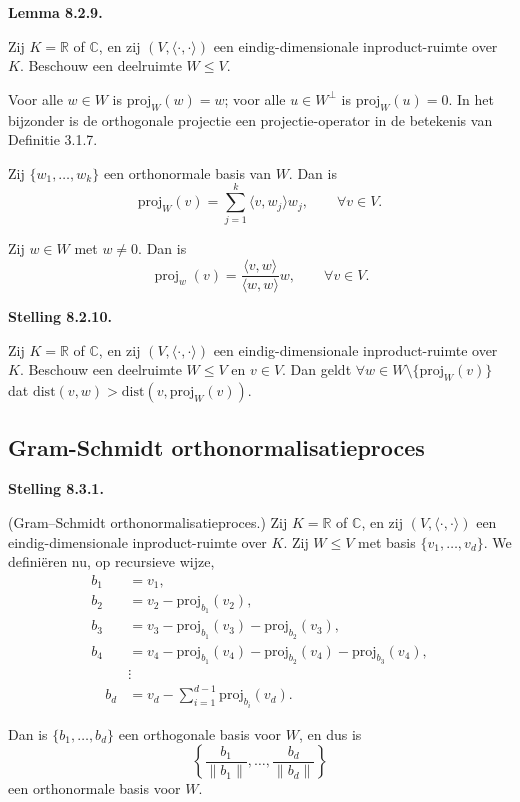 \documentclass[10pt,a4paper]{article}
\newenvironment{res}[2]{%
  \par\noindent\textbf{#1 #2.}%
}{%
  \par\vspace{2pt}\normalfont
}
\begin{document}
\begin{res}{Lemma}{8.2.9}
Zij $K=\mathbb R$ of $\mathbb C$, en zij $(V,\langle\cdot,\cdot\rangle)$ een eindig-dimensionale inproduct-ruimte over $K$. Beschouw een deelruimte $W\le V$.
\begin{myenum}
\item Voor alle $w\in W$ is $\mathrm{proj}_W(w)=w$; voor alle $u\in W^\perp$ is $\mathrm{proj}_W(u)=0$. In het bijzonder is de orthogonale projectie een projectie-operator in de betekenis van Definitie 3.1.7.
\item Zij $\{w_1,\dots,w_k\}$ een orthonormale basis van $W$. Dan is
\[
\mathrm{proj}_W(v)=\sum_{j=1}^k \langle v,w_j\rangle w_j,\qquad \forall v \in V.
\]
\item Zij \(w \in W\) met \(w \neq 0\). Dan is
\[
\operatorname{proj}_w (v) = \frac{\langle v , w \rangle}{\langle w,w\rangle}w, \qquad \forall v \in V.
\]
\end{myenum}
\end{res}

\begin{res}{Stelling}{8.2.10}
Zij $K=\mathbb R$ of $\mathbb C$, en zij $(V,\langle\cdot,\cdot\rangle)$ een eindig-dimensionale inproduct-ruimte over $K$.
Beschouw een deelruimte $W\le V$ en $v\in V$. Dan geldt $\forall w\in W\setminus\{\mathrm{proj}_W(v)\}$ dat $\mathrm{dist}(v,w)>\mathrm{dist}(v,\mathrm{proj}_W(v))$.
\end{res}
\subsection{Gram-Schmidt orthonormalisatieproces}
\begin{res}{Stelling}{8.3.1}
\textup{(Gram--Schmidt orthonormalisatieproces.)}
Zij $K=\mathbb R$ of $\mathbb C$, en zij $(V,\langle\cdot,\cdot\rangle)$ een eindig-dimensionale inproduct-ruimte over $K$.
Zij $W \le V$ met basis $\{v_1,\dots,v_d\}$.
We defini\"eren nu, op recursieve wijze,
\begin{align*}
  b_1&=v_1,\\
  b_2&=v_2-\mathrm{proj}_{b_1}(v_2),\\
  b_3&=v_3-\mathrm{proj}_{b_1}(v_3)-\mathrm{proj}_{b_2}(v_3),\\
  b_4&=v_4-\mathrm{proj}_{b_1}(v_4)-\mathrm{proj}_{b_2}(v_4)-\mathrm{proj}_{b_3}(v_4),\\
  &\vdots\\
  \quad b_d&=v_d-\sum_{i=1}^{d-1}\mathrm{proj}_{b_i}(v_d).
\end{align*}

Dan is $\{b_1,\dots,b_d\}$ een orthogonale basis voor $W$, en dus is
\[
\left\{\frac{b_1}{\|b_1\|},\dots,\frac{b_d}{\|b_d\|}\right\}
\]
een orthonormale basis voor $W$.
\end{res}
\end{document}
